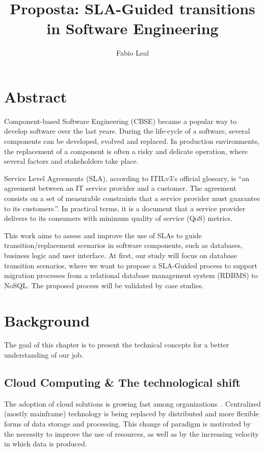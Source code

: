 \documentclass{article}
\begin{document}
\title{Proposta: SLA-Guided transitions in Software Engineering}
\author{Fabio Leal}
\maketitle  


\section{Abstract}
Component-based Software Engineering (CBSE) became a popular way to develop software over the last years. During the life-cycle of a software, several components can be developed, evolved and replaced. In production environments, the replacement of a component is often a risky and delicate operation, where several factors and stakeholders take place.

Service Level Agreements (SLA), according to ITILv3's official glossary, is ``an agreement between an IT service provider and a customer. The agreement consists on a set of measurable constraints that a service provider must guarantee to its customers.''. In practical terms, it is a document that a service provider delivers to its consumers with minimum quality of service (QoS) metrics.

This work aims to assess and improve the use of SLAs to guide transition/replacement scenarios in software components, such as databases, business logic and user interface. At first, our study will focus on database transition scenarios, where we want to propose a SLA-Guided process to support migration processes from a relational database management system (RDBMS) to NoSQL. The proposed process will be validated by case studies.


\section{Background}
The goal of this chapter is to present the technical concepts for a better understanding of our job. 

\subsection{Cloud Computing \& The technological shift}

The adoption of cloud solutions is growing fast among organizations~\cite{6546068}.
Centralized (mostly mainframe) technology is being replaced by distributed and more flexible forms of data storage and processing.
This change of paradigm is motivated by the necessity to improve the use of resources, as well as by the increasing velocity in which data is produced.
\end{document}
